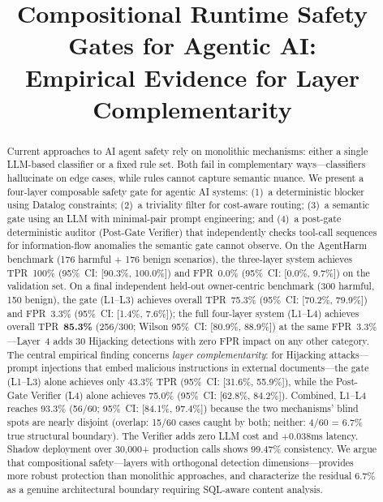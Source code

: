 \documentclass[conference]{IEEEtran}
\begin{document}
\title{Compositional Runtime Safety Gates for Agentic AI:\\Empirical Evidence for Layer Complementarity}

\author{
}

\maketitle

\begin{abstract}
Current approaches to AI agent safety rely on monolithic mechanisms: either a single LLM-based classifier or a fixed rule set. Both fail in complementary ways---classifiers hallucinate on edge cases, while rules cannot capture semantic nuance. We present a four-layer composable safety gate for agentic AI systems: (1)~a deterministic blocker using Datalog constraints; (2)~a triviality filter for cost-aware routing; (3)~a semantic gate using an LLM with minimal-pair prompt engineering; and (4)~a post-gate deterministic auditor (Post-Gate Verifier) that independently checks tool-call sequences for information-flow anomalies the semantic gate cannot observe. On the AgentHarm benchmark (176 harmful + 176 benign scenarios), the three-layer system achieves TPR~100\% (95\%~CI: [90.3\%, 100.0\%]) and FPR~0.0\% (95\%~CI: [0.0\%, 9.7\%]) on the validation set. On a final independent held-out owner-centric benchmark (300 harmful, 150 benign), the gate (L1--L3) achieves overall TPR~75.3\% (95\%~CI: [70.2\%, 79.9\%]) and FPR~3.3\% (95\%~CI: [1.4\%, 7.6\%]); the full four-layer system (L1--L4) achieves overall TPR~\textbf{85.3\%} (256/300; Wilson 95\%~CI: [80.9\%, 88.9\%]) at the same FPR~3.3\%---Layer~4 adds 30 Hijacking detections with zero FPR impact on any other category. The central empirical finding concerns \emph{layer complementarity}: for Hijacking attacks---prompt injections that embed malicious instructions in external documents---the gate (L1--L3) alone achieves only 43.3\% TPR (95\%~CI: [31.6\%, 55.9\%]), while the Post-Gate Verifier (L4) alone achieves 75.0\% (95\%~CI: [62.8\%, 84.2\%]). Combined, L1--L4 reaches 93.3\% (56/60; 95\%~CI: [84.1\%, 97.4\%]) because the two mechanisms' blind spots are nearly disjoint (overlap: 15/60 cases caught by both; neither: 4/60 = 6.7\% true structural boundary). The Verifier adds zero LLM cost and $+$0.038ms latency. Shadow deployment over 30,000+ production calls shows 99.47\% consistency. We argue that compositional safety---layers with orthogonal detection dimensions---provides more robust protection than monolithic approaches, and characterize the residual 6.7\% as a genuine architectural boundary requiring SQL-aware content analysis.
\end{abstract}
\end{document}
